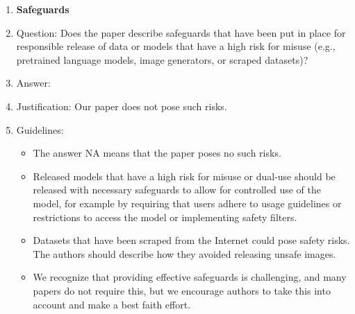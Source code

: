 \documentclass{article}
\begin{document}
\begin{enumerate}
\item {\bf Safeguards}
    \item[] Question: Does the paper describe safeguards that have been put in place for responsible release of data or models that have a high risk for misuse (e.g., pretrained language models, image generators, or scraped datasets)?
    \item[] Answer: \answerNA{} %
    \item[] Justification: Our paper does not pose such risks.
    \item[] Guidelines:
    \begin{itemize}
        \item The answer NA means that the paper poses no such risks.
        \item Released models that have a high risk for misuse or dual-use should be released with necessary safeguards to allow for controlled use of the model, for example by requiring that users adhere to usage guidelines or restrictions to access the model or implementing safety filters. 
        \item Datasets that have been scraped from the Internet could pose safety risks. The authors should describe how they avoided releasing unsafe images.
        \item We recognize that providing effective safeguards is challenging, and many papers do not require this, but we encourage authors to take this into account and make a best faith effort.
    \end{itemize}


\end{enumerate}
\end{document}
